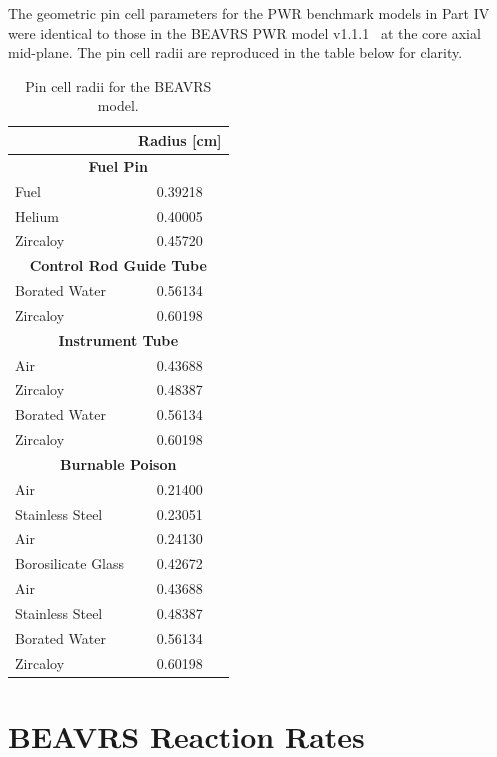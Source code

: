 \begin{appendices}
The geometric pin cell parameters for the \ac{PWR} benchmark models in Part IV were identical to those in the \ac{BEAVRS} \ac{PWR} model v1.1.1~\cite{horelik2013beavrs} at the core axial mid-plane. The pin cell radii are reproduced in the table below for clarity.

\renewcommand{\arraystretch}{0.9}
\begin{table}[h!]
  \centering
  \caption[BEAVRS pin cell radii]{Pin cell radii for the \ac{BEAVRS} model.}
  \small
  \label{table:app-pin-cell-radii} 
  \vspace{6pt}
  \begin{tabular}{l c}
  \toprule
  \rowcolor{lightgray}
  \multicolumn{1}{c}{\bf Material} &
  \multicolumn{1}{c}{\bf Radius [cm]} \\
  \midrule
  \multicolumn{2}{c}{\bf Fuel Pin} \\
  \midrule
  Fuel &  0.39218 \\
  Helium & 0.40005 \\
  Zircaloy & 0.45720 \\
  \midrule
  \multicolumn{2}{c}{\bf Control Rod Guide Tube} \\
  \midrule
  Borated Water & 0.56134 \\
  Zircaloy & 0.60198 \\
  \midrule
  \multicolumn{2}{c}{\bf Instrument Tube} \\
  \midrule
  Air & 0.43688 \\
  Zircaloy & 0.48387 \\
  Borated Water & 0.56134 \\
  Zircaloy & 0.60198 \\
  \midrule
  \multicolumn{2}{c}{\bf Burnable Poison} \\
  \midrule
  Air & 0.21400 \\
  Stainless Steel & 0.23051 \\
  Air & 0.24130 \\
  Borosilicate Glass & 0.42672 \\
  Air & 0.43688 \\
  Stainless Steel & 0.48387 \\
  Borated Water & 0.56134 \\
  Zircaloy & 0.60198 \\
  \bottomrule
\end{tabular}
\end{table}


\section{BEAVRS Reaction Rates}
\label{sec:beavrs-rxn-rates}


\end{appendices}
